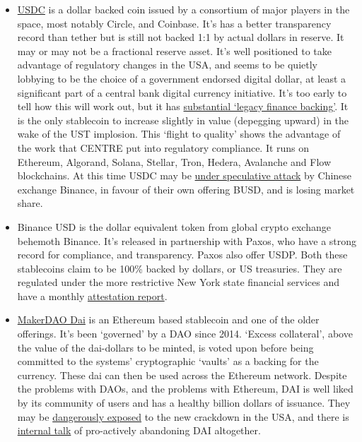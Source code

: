 \begin{itemize}
\item \href{https://f.hubspotusercontent30.net/hubfs/9304636/PDF/centre-whitepaper.pdf}{USDC} is a dollar backed coin issued by a consortium of major players in the space, most notably Circle, and Coinbase. It's has a better transparency record than tether but is still not backed 1:1 by actual dollars in reserve. It may or may not be a fractional reserve asset. It's  well positioned to take advantage of regulatory changes in the USA, and seems to be quietly lobbying to be the choice of a government endorsed digital dollar, at least a significant part of a central bank digital currency initiative. It's too early to tell how this will work out, but it has \href{https://www.forbes.com/sites/ninabambysheva/2022/04/13/blackrocks-newest-investment-paves-the-way-for-digital-assets-on-wall-street/?}{substantial `legacy finance backing'}. It is the only stablecoin to increase slightly in value (depegging upward) in the wake of the UST implosion. This `flight to quality' shows the advantage of the work that CENTRE put into regulatory compliance. It runs on Ethereum, Algorand, Solana, Stellar, Tron, Hedera, Avalanche and Flow blockchains. At this time USDC may be \href{https://twitter.com/Excellion/status/1567472488589963264}{under speculative attack} by Chinese exchange Binance, in favour of their own offering BUSD, and is losing market share. 
\item Binance USD is the dollar equivalent token from global crypto exchange behemoth Binance. It's released in partnership with Paxos, who have a strong record for compliance, and transparency. Paxos also offer USDP. Both these stablecoins claim to be 100\% backed by dollars, or US treasuries. They are regulated under the more restrictive New York state financial services and have a monthly \href{https://paxos.com/attestations/}{attestation report}.
\item \href{https://makerdao.com/en/whitepaper#abstract}{MakerDAO Dai} is an Ethereum based stablecoin and one of the older offerings. It's been `governed' by a DAO since 2014. `Excess collateral', above the value of the dai-dollars to be minted, is voted upon before being committed to the systems' cryptographic `vaults' as a backing for the currency. These dai can then be used across the Ethereum network. Despite the problems with DAOs, and the problems with Ethereum, DAI is well liked by its community of users and has a healthy billion dollars of issuance. They may be \href{https://thedefiant.io/tornado-impact-makerdao-dai}{dangerously exposed} to the new crackdown in the USA, and there is \href{https://twitter.com/bantg/status/1557733094899138560}{internal talk} of pro-actively abandoning DAI altogether.

\end{itemize}
